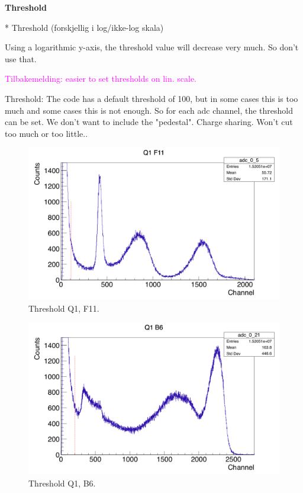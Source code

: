 \documentclass[twoside,english]{uiofysmaster/uiofysmaster}
\begin{document}
\textbf{Threshold}

* Threshold (forskjellig i log/ikke-log skala)

Using a logarithmic y-axis, the threshold value will decrease very much. So don't use that. 

\textcolor{Magenta}{Tilbakemelding: \newline 
easier to set thresholds on lin. scale.
}

Threshold: The code has a default threshold of 100, but in some cases this is too much and some cases this is not enough. So for each adc channel, the threshold can be set. We don't want to include the "pedestal". Charge sharing.
Won't cut too much or too little..

\begin{figure}[ht]
	\centering
	\includegraphics[width=\textwidth]{../Plots/plotting/Threshold_Q1_f11.png}
	\caption{Threshold Q1, F11.}
	\label{fig:Threshold_f}
\end{figure}


\begin{figure}[ht]
	\centering
	\includegraphics[width=\textwidth]{../Plots/plotting/Threshold_Q1_b6.png}
	\caption{Threshold Q1, B6.}
	\label{fig:Threshold_b}
\end{figure}
\end{document}
